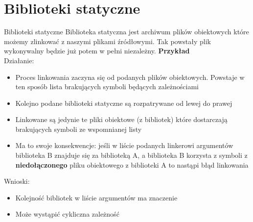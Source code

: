 \section{Biblioteki statyczne}
\begin{frame}[allowframebreaks]{Biblioteki statyczne}
  Biblioteka statyczna jest archiwum plików obiektowych które możemy zlinkować z
  naszymi plikami źródłowymi. Tak powstały plik wykonywalny będzie już potem w
  pełni niezależny. \textbf{Przykład}\\

  Działanie:
  \begin{itemize}
  \item Proces linkowania zaczyna się od podanych plików obiektowych. Powstaje w
    ten sposób lista brakujących symboli będących zależnościami
  \item Kolejno podane biblioteki statyczne są rozpatrywane od lewej do prawej
	\item Linkowane są jedynie te pliki obiektowe (z bibliotek)
    które dostarczają brakujących symboli ze wspomnianej listy
  \item Ma to swoje konsekwencje: jeśli w liście podanych linkerowi argumentów
    biblioteka B znajduje się za biblioteką A, a biblioteka B korzysta z symboli
    z \textbf{niedołączonego} pliku obiektowego z biblioteki A to nastąpi błąd
    linkowania
  \end{itemize}
  Wnioski:
  \begin{itemize}
  \item Kolejność bibliotek w liście argumentów ma znaczenie
  \item Może wystąpić cykliczna zależność
  \end{itemize}
\end{frame}
